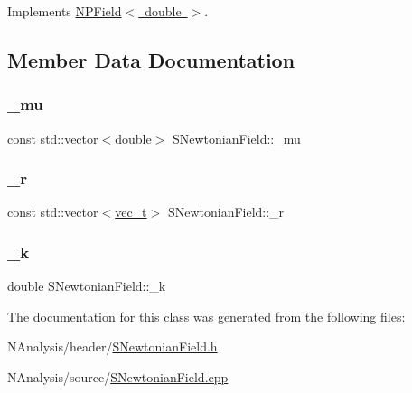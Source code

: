 Implements \mbox{\hyperlink{class_n_p_field_a6b92c4782bf41c0b81751821b93eb445}{N\+P\+Field$<$ double $>$}}.



\subsection{Member Data Documentation}
\mbox{\label{class_s_newtonian_field_a2f447c353aa350e8e06f1167077a6577}} 
\subsubsection{\texorpdfstring{\_mu}{\_mu}}
{\footnotesize\ttfamily const std\+::vector$<$double$>$ S\+Newtonian\+Field\+::\+\_\+mu\hspace{0.3cm}{\ttfamily [protected]}}

\mbox{\label{class_s_newtonian_field_ae905751c50bc53c9c9ad020d5d0b68b1}} 
\subsubsection{\texorpdfstring{\_r}{\_r}}
{\footnotesize\ttfamily const std\+::vector$<$\mbox{\hyperlink{group___n_algebra_ga0a2cfc67e738a3d73e4f12098c4c07f6}{vec\+\_\+t}}$>$ S\+Newtonian\+Field\+::\+\_\+r\hspace{0.3cm}{\ttfamily [protected]}}

\mbox{\label{class_s_newtonian_field_a6d87be6a91cbdd8b70890b00aac87127}} 
\subsubsection{\texorpdfstring{\_k}{\_k}}
{\footnotesize\ttfamily double S\+Newtonian\+Field\+::\+\_\+k\hspace{0.3cm}{\ttfamily [protected]}}



The documentation for this class was generated from the following files\+:\begin{DoxyCompactItemize}
\item 
N\+Analysis/header/\mbox{\hyperlink{_s_newtonian_field_8h}{S\+Newtonian\+Field.\+h}}\item 
N\+Analysis/source/\mbox{\hyperlink{_s_newtonian_field_8cpp}{S\+Newtonian\+Field.\+cpp}}\end{DoxyCompactItemize}
